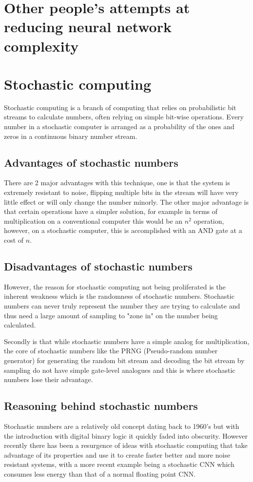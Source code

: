 \documentclass[a4paper,oneside,phd,etd]{BYUPhys}
\begin{document}
\section{Other people's attempts at reducing neural network complexity}


\section{Stochastic computing}

Stochastic computing is a branch of computing that relies on probabilistic bit streams to calculate numbers, often relying on simple bit-wise operations. Every number in a stochastic computer is arranged as a probability of the ones and zeros in a continuous binary number stream\cite{stochastic-numbers}.

\subsection{Advantages of stochastic numbers}
There are 2 major advantages with this technique, one is that the system is extremely resistant to noise, flipping multiple bits in the stream will have very little effect or will only change the number minorly. The other major advantage is that certain operations have a simpler solution, for example in terms of multiplication on a conventional computer this would be an $n^2$ operation, however, on a stochastic computer, this is accomplished with an AND gate at a cost of $n$.

\subsection{Disadvantages of stochastic numbers}
However, the reason for stochastic computing not being proliferated is the inherent weakness which is the randomness of stochastic numbers. Stochastic numbers can never truly represent the number they are trying to calculate and thus need a large amount of sampling to "zone in" on the number being calculated.

Secondly is that while stochastic numbers have a simple analog for multiplication, the core of stochastic numbers like the PRNG (Pseudo-random number generator) for generating the random bit stream and decoding the bit stream by sampling do not have simple gate-level analogues and this is where stochastic numbers lose their advantage.

\subsection{Reasoning behind stochastic numbers}
Stochastic numbers are a relatively old concept dating back to 1960's but with the introduction with digital binary logic it quickly faded into obscurity. However recently there has been a resurgence of ideas with stochastic computing that take advantage of its properties and use it to create faster better and more noise resistant systems, with a more recent example being a stochastic CNN which consumes less energy than that of a normal floating point CNN\cite{stochastic-cnn}.
\end{document}
